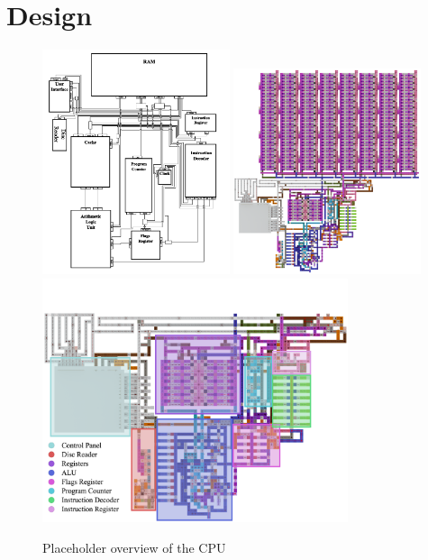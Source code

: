 \chapter{Design}

\label{Chapter2}

\begin{figure}[!h]
    \begin{center}
        \includegraphics[width=0.49\textwidth]{Figures/Layout_1.png}
        \includegraphics[width=0.49\textwidth]{Figures/CPU-Full-small.png}
        \includegraphics[width=0.8\textwidth]{Figures/CPU-Core-small.png}
        \caption{Placeholder overview of the CPU}
        \label{fig::Overview}
    \end{center}
\end{figure}

